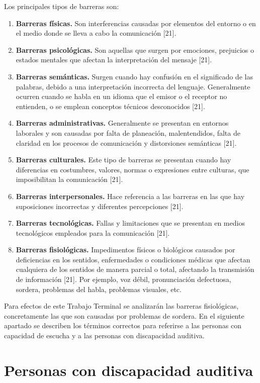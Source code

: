 Los principales tipos de barreras son:
\begin{enumerate}
    \item \textbf{Barreras físicas.} Son interferencias causadas por elementos del entorno o en el medio donde se lleva a cabo la comunicación [21].
    \item \textbf{Barreras psicológicas.} Son aquellas que surgen por emociones, prejuicios o estados mentales que afectan la interpretación del mensaje [21].
    \item \textbf{Barreras semánticas.} Surgen cuando hay confusión en el significado de las palabras, debido a una interpretación incorrecta del lenguaje. Generalmente ocurren cuando se habla en un idioma que el emisor o el receptor no entienden, o se emplean conceptos técnicos desconocidos [21].
    \item \textbf{Barreras administrativas.} Generalmente se presentan en entornos laborales y son causadas por falta de planeación, malentendidos, falta de claridad en los procesos de comunicación y distorsiones semánticas [21].
    \item \textbf{Barreras culturales.} Este tipo de barreras se presentan cuando hay diferencias en costumbres, valores, normas o expresiones entre culturas, que imposibilitan la comunicación [21].
    \item \textbf{Barreras interpersonales.} Hace referencia a las barreras en las que hay suposiciones incorrectas y diferentes percepciones [21].
    \item \textbf{Barreras tecnológicas.} Fallas y limitaciones que se presentan en medios tecnológicos empleados para la comunicación [21].
    \item \textbf{Barreras fisiológicas.} Impedimentos físicos o biológicos causados por deficiencias en los sentidos, enfermedades o condiciones médicas que afectan cualquiera de los sentidos de manera parcial o total, afectando la transmisión de información [21]. Por ejemplo, voz débil, pronunciación defectuosa, sordera, problemas del habla, problemas visuales, etc.
\end{enumerate}
Para efectos de este Trabajo Terminal se analizarán las barreras fisiológicas, concretamente las que son causadas por problemas de sordera. En el siguiente apartado se describen los términos correctos para referirse a las personas con capacidad de escucha y a las personas con discapacidad auditiva.\\

\section{Personas con discapacidad auditiva}
